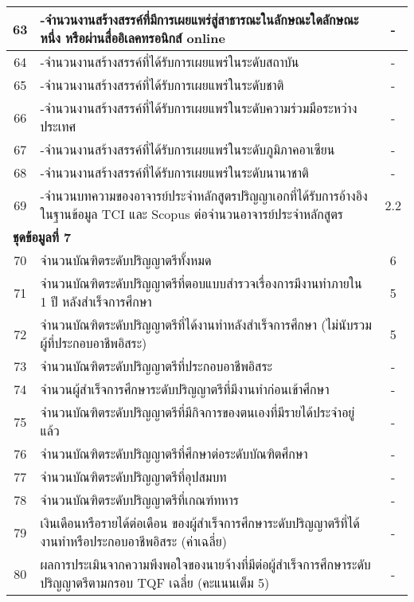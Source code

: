 \begin{longtable}{|c|p{}|c|}
	63&-จำนวนงานสร้างสรรค์ที่มีการเผยแพร่สู่สาธารณะในลักษณะใดลักษณะหนึ่ง หรือผ่านสื่ออิเลคทรอนิกส์ online&-\\\hline
	64&-จำนวนงานสร้างสรรค์ที่ได้รับการเผยแพร่ในระดับสถาบัน&-\\\hline
	65&-จำนวนงานสร้างสรรค์ที่ได้รับการเผยแพร่ในระดับชาติ&-\\\hline
	66&-จำนวนงานสร้างสรรค์ที่ได้รับการเผยแพร่ในระดับความร่วมมือระหว่างประเทศ&-\\\hline
	67&-จำนวนงานสร้างสรรค์ที่ได้รับการเผยแพร่ในระดับภูมิภาคอาเซียน&-\\\hline
	68&-จำนวนงานสร้างสรรค์ที่ได้รับการเผยแพร่ในระดับนานาชาติ &-\\\hline
	69&-จำนวนบทความของอาจารย์ประจำหลักสูตรปริญญาเอกที่ได้รับการอ้างอิงในฐานข้อมูล TCI และ Scopus ต่อจำนวนอาจารย์ประจำหลักสูตร &2.2\\\hline
	
	\multicolumn{3}{|l|}{\textbf{ชุดข้อมูลที่ 7}}\\\hline
	70&จำนวนบัณฑิตระดับปริญญาตรีทั้งหมด& 6\\\hline
	71&จำนวนบัณฑิตระดับปริญญาตรีที่ตอบแบบสำรวจเรื่องการมีงานทำภายใน 1 ปี หลังสำเร็จการศึกษา& 5\\\hline
	72&จำนวนบัณฑิตระดับปริญญาตรีที่ได้งานทำหลังสำเร็จการศึกษา (ไม่นับรวมผู้ที่ประกอบอาชีพอิสระ)& 5\\\hline
	73&จำนวนบัณฑิตระดับปริญญาตรีที่ประกอบอาชีพอิสระ &-\\\hline
	74&จำนวนผู้สำเร็จการศึกษาระดับปริญญาตรีที่มีงานทำก่อนเข้าศึกษา &-\\\hline
	75&จำนวนบัณฑิตระดับปริญญาตรีที่มีกิจการของตนเองที่มีรายได้ประจำอยู่แล้ว&-\\\hline
	76&จำนวนบัณฑิตระดับปริญญาตรีที่ศึกษาต่อระดับบัณฑิตศึกษา&-\\\hline
	77&จำนวนบัณฑิตระดับปริญญาตรีที่อุปสมบท&-\\\hline
	78&จำนวนบัณฑิตระดับปริญญาตรีที่เกณฑ์ทหาร&-\\\hline
	79&เงินเดือนหรือรายได้ต่อเดือน ของผู้สำเร็จการศึกษาระดับปริญญาตรีที่ได้งานทำหรือประกอบอาชีพอิสระ (ค่าเฉลี่ย)&-\\\hline
	80&ผลการประเมินจากความพึงพอใจของนายจ้างที่มีต่อผู้สำเร็จการศึกษาระดับปริญญาตรีตามกรอบ TQF เฉลี่ย (คะแนนเต็ม 5)& - \\\hline
	

\end{longtable}
